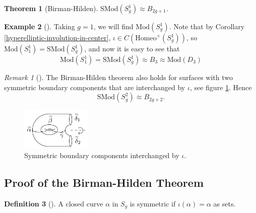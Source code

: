 \documentclass[reqno]{amsart}
\newtheorem{theorem}{Theorem}[section]
\theoremstyle{definition}
\newtheorem{definition}[theorem]{Definition}
\newtheorem{example}[theorem]{Example}
\theoremstyle{remark}
\newtheorem*{remark}{Remark}
\newcommand{\Mod}{{\mathrm{Mod}}}
\newcommand{\SMod}{{\mathrm{SMod}}}
\newcommand{\Homeo}{{\mathrm{Homeo}}}
\begin{document}
   \begin{theorem}[Birman-Hilden]
       $\SMod \left( S_g^{1} \right) \approx
       B_{2g+1}$.
   \end{theorem}


   \begin{example}[]
       Taking $g=1$, we will find
       $\Mod \left( S_g^{1} \right) $.
       Note that by Corollary
       \ref{hyperelliptic-involution-in-center},
       $\iota \in C\left( 
       \Homeo^{+}\left( S_g^{1} \right)  \right)  $, so
       $\Mod \left( S_1^{1} \right) =
       \SMod\left( S_g^{1} \right) $, and now it is
       easy to see that
       \[
       \Mod \left( S_1^{1} \right) = \SMod \left( S_g^{1} \right) 
       \approx B_{3} \approx \Mod \left( D_3 \right) 
       \] 
   \end{example}

   \begin{remark}[]
       The Birman-Hilden theorem also holds for
       surfaces with two symmetric boundary
       components that are interchanged by
       $\iota$, see figure
       \ref{fig:-Birman-Hilden-two-symmetric-boundary-components-png}.
       Hence
       \[
       \SMod \left( S_g^{2} \right) 
       \approx B_{2g+2}.
       \] 

        \begin{figure}[htpb]
           \centering
           \includegraphics[width=0.3\textwidth]{
           Birman-Hilden-two-symmetric-boundary-components.png}
           \caption{Symmetric boundary components
           interchanged by $\iota$.}
           \label{fig:-Birman-Hilden-two-symmetric-boundary-components-png}
       \end{figure}
   \end{remark}





   \subsection{Proof of the Birman-Hilden Theorem}

   \begin{definition}[]
       A closed curve $\alpha$ in $S_g$ is symmetric
       if $\iota \left( \alpha \right) = \alpha$ as sets.
   \end{definition}
\end{document}
